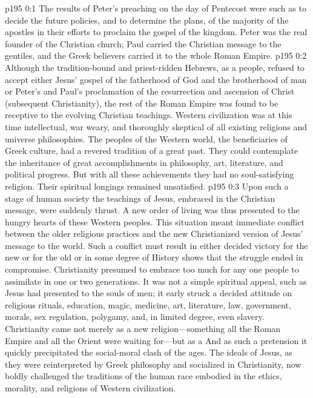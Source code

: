 \author{Midwayer Commission}
\vs p195 0:1 The results of Peter’s preaching on the day of Pentecost were such as to decide the future policies, and to determine the plans, of the majority of the apostles in their efforts to proclaim the gospel of the kingdom. Peter was the real founder of the Christian church; Paul carried the Christian message to the gentiles, and the Greek believers carried it to the whole Roman Empire.
\vs p195 0:2 Although the tradition\hyp{}bound and priest\hyp{}ridden Hebrews, as a people, refused to accept either Jesus’ gospel of the fatherhood of God and the brotherhood of man or Peter’s and Paul’s proclamation of the resurrection and ascension of Christ (subsequent Christianity), the rest of the Roman Empire was found to be receptive to the evolving Christian teachings. Western civilization was at this time intellectual, war weary, and thoroughly skeptical of all existing religions and universe philosophies. The peoples of the Western world, the beneficiaries of Greek culture, had a revered tradition of a great past. They could contemplate the inheritance of great accomplishments in philosophy, art, literature, and political progress. But with all these achievements they had no soul\hyp{}satisfying religion. Their spiritual longings remained unsatisfied.\plusone
\vs p195 0:3 Upon such a stage of human society the teachings of Jesus, embraced in the Christian message, were suddenly thrust. A new order of living was thus presented to the hungry hearts of these Western peoples. This situation meant immediate conflict between the older religious practices and the new Christianized version of Jesus’ message to the world. Such a conflict must result in either decided victory for the new or for the old or in some degree of  History shows that the struggle ended in compromise. Christianity presumed to embrace too much for any one people to assimilate in one or two generations. It was not a simple spiritual appeal, such as Jesus had presented to the souls of men; it early struck a decided attitude on religious rituals, education, magic, medicine, art, literature, law, government, morals, sex regulation, polygamy, and, in limited degree, even slavery. Christianity came not merely as a new religion---something all the Roman Empire and all the Orient were waiting for---but as a  And as such a pretension it quickly precipitated the social\hyp{}moral clash of the ages. The ideals of Jesus, as they were reinterpreted by Greek philosophy and socialized in Christianity, now boldly challenged the traditions of the human race embodied in the ethics, morality, and religions of Western civilization.\plusone
